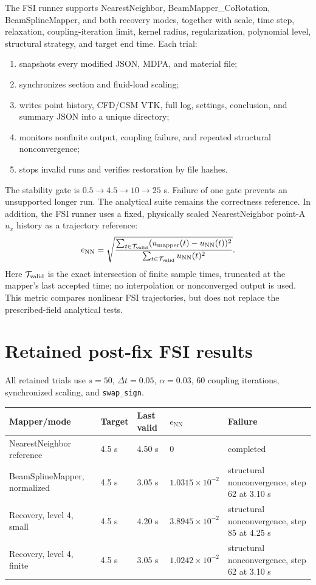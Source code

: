 \documentclass[11pt,a4paper]{article}
\begin{document}
The FSI runner supports NearestNeighbor, BeamMapper\_CoRotation,
BeamSplineMapper, and both recovery modes, together with scale, time step,
relaxation, coupling-iteration limit, kernel radius, regularization,
polynomial level, structural strategy, and target end time.  Each trial:
\begin{enumerate}
\item snapshots every modified JSON, MDPA, and material file;
\item synchronizes section and fluid-load scaling;
\item writes point history, CFD/CSM VTK, full log, settings, conclusion, and
      summary JSON into a unique directory;
\item monitors nonfinite output, coupling failure, and repeated structural
      nonconvergence;
\item stops invalid runs and verifies restoration by file hashes.
\end{enumerate}

The stability gate is \(0.5\rightarrow4.5\rightarrow10\rightarrow25\) s.
Failure of one gate prevents an unsupported longer run.  The analytical suite
remains the correctness reference.  In addition, the FSI runner uses a fixed,
physically scaled NearestNeighbor point-A \(u_x\) history as a trajectory
reference:
\[
 e_{\mathrm{NN}} =
 \sqrt{\frac{\sum_{t\in{\cal T}_{\mathrm{valid}}}
 (u_{\mathrm{mapper}}(t)-u_{\mathrm{NN}}(t))^2}
 {\sum_{t\in{\cal T}_{\mathrm{valid}}}u_{\mathrm{NN}}(t)^2}} .
\]
Here \({\cal T}_{\mathrm{valid}}\) is the exact intersection of finite sample
times, truncated at the mapper's last accepted time; no interpolation or
nonconverged output is used.  This metric compares nonlinear FSI trajectories,
but does not replace the prescribed-field analytical tests.

\section{Retained post-fix FSI results}

All retained trials use \(s=50\), \(\Delta t=0.05\), \(\alpha=0.03\), 60
coupling iterations, synchronized scaling, and \texttt{swap\_sign}.

\begin{center}
\begin{tabular}{p{40mm}p{15mm}p{18mm}p{22mm}p{43mm}}
\toprule
Mapper/mode & Target & Last valid & \(e_{\mathrm{NN}}\) & Failure\\
\midrule
NearestNeighbor reference
&4.5 s&4.50 s&0&completed\\
BeamSplineMapper, normalized
&4.5 s&3.05 s&\(1.0315\times10^{-2}\)&structural nonconvergence, step 62 at 3.10 s\\
Recovery, level 4, small
&4.5 s&4.20 s&\(3.8945\times10^{-2}\)&structural nonconvergence, step 85 at 4.25 s\\
Recovery, level 4, finite
&4.5 s&3.05 s&\(1.0242\times10^{-2}\)&structural nonconvergence, step 62 at 3.10 s\\
\bottomrule
\end{tabular}
\end{center}
\end{document}

